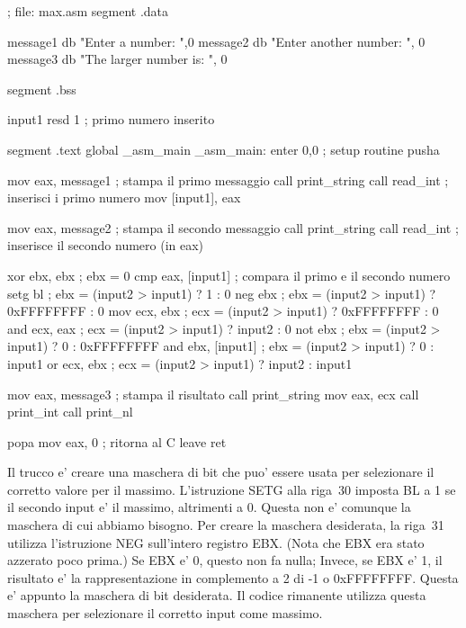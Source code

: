 \begin{AsmCodeListing}
; file: max.asm
segment .data

message1 db "Enter a number: ",0
message2 db "Enter another number: ", 0
message3 db "The larger number is: ", 0

segment .bss

input1  resd    1        ; primo numero inserito

segment .text
        global  _asm_main
_asm_main:
        enter   0,0               ; setup routine
        pusha

        mov     eax, message1     ; stampa il primo messaggio
        call    print_string
        call    read_int          ; inserisci i primo numero
        mov     [input1], eax

        mov     eax, message2     ; stampa il secondo messaggio
        call    print_string
        call    read_int          ; inserisce il secondo numero (in eax)

        xor     ebx, ebx          ; ebx = 0
        cmp     eax, [input1]     ; compara il primo e il secondo numero
        setg    bl                ; ebx = (input2 > input1) ?          1 : 0
        neg     ebx               ; ebx = (input2 > input1) ? 0xFFFFFFFF : 0
        mov     ecx, ebx          ; ecx = (input2 > input1) ? 0xFFFFFFFF : 0
        and     ecx, eax          ; ecx = (input2 > input1) ?     input2 : 0
        not     ebx               ; ebx = (input2 > input1) ?          0 : 0xFFFFFFFF
        and     ebx, [input1]     ; ebx = (input2 > input1) ?          0 : input1
        or      ecx, ebx          ; ecx = (input2 > input1) ?     input2 : input1

        mov     eax, message3     ; stampa il risultato
        call    print_string
        mov     eax, ecx
        call    print_int
        call    print_nl

        popa
        mov     eax, 0            ; ritorna al C
        leave                     
        ret
\end{AsmCodeListing}

Il trucco e' creare una maschera di bit che puo' essere usata per
selezionare il corretto valore per il massimo. L'istruzione {\code SETG}
alla riga~30 imposta BL a 1 se il secondo input e' il massimo, altrimenti
a 0. Questa non e' comunque la maschera di cui abbiamo bisogno. Per creare
la maschera desiderata, la riga~31 utilizza l'istruzione {\code NEG}
sull'intero registro EBX. (Nota che EBX era stato azzerato poco prima.)
Se EBX e' 0, questo non fa nulla; Invece, se EBX e' 1, il risultato
e' la rappresentazione in complemento a 2 di -1 o 0xFFFFFFFF. Questa
e' appunto la maschera di bit desiderata. Il codice rimanente utilizza
questa maschera per selezionare il corretto input come massimo.  

